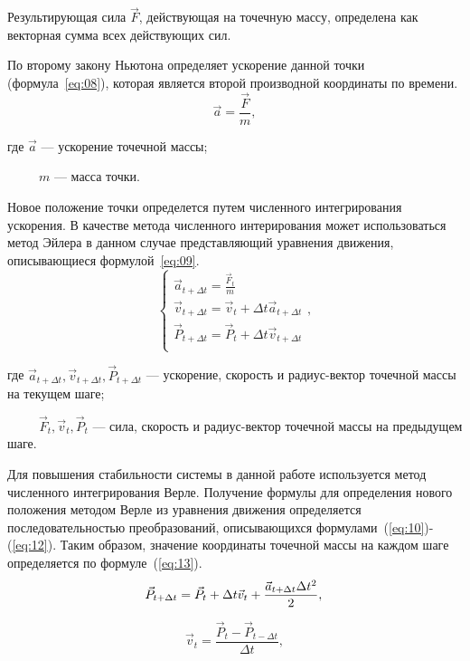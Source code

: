 Результирующая сила $\vec{F}$, действующая на точечную массу, определена как
векторная сумма всех действующих сил.

По второму закону Ньютона определяет ускорение данной точки
(формула~\ref{eq:08}), которая является второй производной координаты по
времени. 
\begin{equation}\label{eq:08}
    \vec{a} = \frac{\vec{F}}{m},
\end{equation}

        где $\vec{a}$ --- ускорение точечной массы;

        ~~~~~$m$ --- масса точки.

Новое положение точки определется путем численного интегрирования ускорения.  В
качестве метода численного интерирования может использоваться метод Эйлера в
данном случае представляющий уравнения движения, описывающиеся
формулой~\ref{eq:09}. 
\begin{equation}\label{eq:09}
    \begin{cases}
        \vec{a}_{t+\Delta t} = \frac{\vec{F}_{t}}{m} \\
        \vec{v}_{t+\Delta t} = \vec{v}_{t} + \Delta t\vec{a}_{t+\Delta t} \\
        \vec{P}_{t+\Delta t} = \vec{P}_{t} + \Delta t\vec{v}_{t+\Delta t} \\
    \end{cases}
    ,
\end{equation}

где $\vec{a}_{t+\Delta t}, \vec{v}_{t+\Delta t}, \vec{P}_{t+\Delta t}$ ---
ускорение, скорость и радиус-вектор точечной массы на текущем шаге;

~~~~~$\vec{F}_{t}, \vec{v}_{t}, \vec{P}_{t}$ --- сила, скорость и радиус-вектор
точечной массы на предыдущем шаге.

Для повышения стабильности системы в данной работе используется метод численного
интегрирования Верле. Получение формулы для определения нового положения методом
Верле из уравнения движения определяется последовательностью преобразований,
описывающихся формулами~(\ref{eq:10})-(\ref{eq:12}).  Таким образом, значение
координаты точечной массы на каждом шаге определяется по формуле~(\ref{eq:13}).
\begin{equation}\label{eq:10}
    \vec{P}_{t+\Delta t} = \vec{P}_{t} + \Delta t\vec{v}_{t} +
    \frac{\vec{a}_{t+\Delta t}\Delta{t}^2}{2}, \\
\end{equation}

\begin{equation}\label{eq:11}
    \vec{v}_{t} = \frac{\vec{P}_{t} - \vec{P}_{t-\Delta t}}{\Delta t},
\end{equation}


